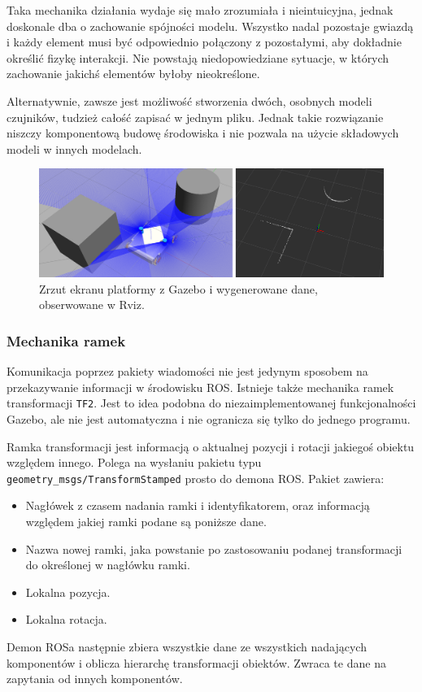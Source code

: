 			Taka mechanika działania wydaje się mało zrozumiała i nieintuicyjna, jednak doskonale dba o zachowanie spójności modelu.
			Wszystko nadal pozostaje gwiazdą i każdy element musi być odpowiednio połączony z pozostałymi, aby dokładnie określić fizykę interakcji.
			Nie powstają niedopowiedziane sytuacje, w których zachowanie jakichś elementów byłoby nieokreślone.

			Alternatywnie, zawsze jest możliwość stworzenia dwóch, osobnych modeli czujników, tudzież całość zapisać w jednym pliku.
			Jednak takie rozwiązanie niszczy komponentową budowę środowiska i nie pozwala na użycie składowych modeli w innych modelach.
			
			\begin{figure}[h]
			\centering
			\includegraphics[width=\textwidth]{graphics/scan.png}
			\caption{Zrzut ekranu platformy z Gazebo i wygenerowane dane, obserwowane w Rviz.}
			\label{fig:scan}
			\end{figure}
			
		\subsubsection{Mechanika ramek}
			\label{sec:frames}
			Komunikacja poprzez pakiety wiadomości nie jest jedynym sposobem na przekazywanie informacji w środowisku ROS.
			Istnieje także mechanika ramek transformacji \texttt{TF2}.
			Jest to idea podobna do niezaimplementowanej funkcjonalności Gazebo, ale nie jest automatyczna i nie ogranicza się tylko do jednego programu.
			
			Ramka transformacji jest informacją o aktualnej pozycji i rotacji jakiegoś obiektu względem innego.
			Polega na wysłaniu pakietu typu \texttt{geometry\_msgs/TransformStamped} prosto do demona ROS.
			Pakiet zawiera:
			\begin{itemize}
				\item Nagłówek z czasem nadania ramki i identyfikatorem, oraz informacją względem jakiej ramki podane są poniższe dane.
				\item Nazwa nowej ramki, jaka powstanie po zastosowaniu podanej transformacji do określonej w nagłówku ramki.
				\item Lokalna pozycja.
				\item Lokalna rotacja.
			\end{itemize}
			Demon ROSa następnie zbiera wszystkie dane ze wszystkich nadających komponentów i oblicza hierarchę transformacji obiektów.
			Zwraca te dane na zapytania od innych komponentów.
			
